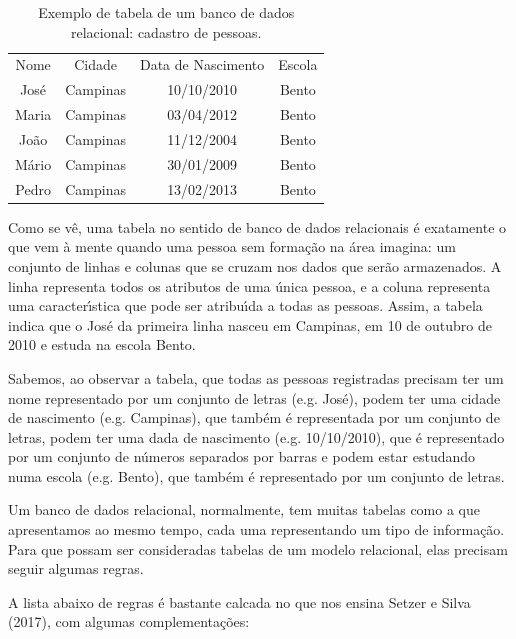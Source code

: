 \documentclass[
12pt,		%
openright,	%
twoside,  %
a4paper,			%
chapter=TITLE,		%
english,			%
french,				%
spanish,			%
brazil				%
]{USPSC-classe/USPSC}
\begin{document}
\begin{table}[htb]
\tiny
\caption{\label{f66c1ac239a347d2b455611f794c18300b1974b6}Exemplo de tabela de um banco de dados relacional: cadastro de pessoas.}

\centering
\begin{tabular}{|c|c|c|c|}
\hline
Nome  &  Cidade  &  Data de Nascimento  &  Escola \\
Jos\'e  &  Campinas  &  10/10/2010  &  Bento \\
Maria  &  Campinas  &  03/04/2012  &  Bento \\
Jo\~ao  &  Campinas  &  11/12/2004  &  Bento \\
M\'ario  &  Campinas  &  30/01/2009  &  Bento \\
Pedro  &  Campinas  &  13/02/2013  &  Bento \\
\hline
\end{tabular}
\end{table}


Como se v\^e, uma tabela no sentido de banco de dados relacionais \'e exatamente o que vem \`a mente quando uma pessoa sem forma\c{c}\~ao na \'area imagina: um conjunto de linhas e colunas que se cruzam nos dados que ser\~ao armazenados. A linha representa todos os atributos de uma \'unica pessoa, e a coluna representa uma caracter\'{\i}stica que pode ser atribu\'{\i}da a todas as pessoas. Assim, a tabela indica que o  Jos\'e da primeira linha nasceu em Campinas, em 10 de outubro de 2010 e estuda na escola Bento.




Sabemos, ao observar a tabela, que todas as pessoas registradas precisam ter um nome representado por um conjunto de letras (e.g. Jos\'e), podem ter uma cidade de nascimento (e.g. Campinas), que tamb\'em \'e representada por um conjunto de letras, podem ter uma dada de nascimento (e.g. 10/10/2010), que \'e representado por um conjunto de n\'umeros separados por barras e podem estar estudando numa escola (e.g. Bento), que tamb\'em \'e representado por um conjunto de letras.




Um banco de dados relacional, normalmente, tem muitas tabelas como a que apresentamos ao mesmo tempo, cada uma representando um tipo de informa\c{c}\~ao. Para que possam ser consideradas tabelas de um modelo relacional, elas precisam seguir algumas regras.




A lista abaixo de regras \'e bastante calcada no que nos ensina  Setzer e Silva (2017), com algumas complementa\c{c}\~oes:
\end{document}
